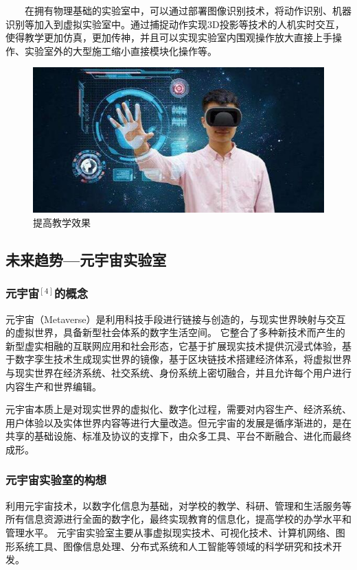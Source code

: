 \documentclass{imutthesis}
\begin{document}
\begin{itemize}
    $\qquad$在拥有物理基础的实验室中，可以通过部署图像识别技术，将动作识别、机器识别等加入到虚拟实验室中。通过捕捉动作实现3D投影等技术的人机实时交互，使得教学更加仿真，更加传神，并且可以实现实验室内围观操作放大直接上手操作、实验室外的大型施工缩小直接模块化操作等。
    \begin{figure}[htbp]
        \centering
        \includegraphics{提高.jpg}
        \caption{提高教学效果}
    \end{figure}

\end{itemize}
\subsection{未来趋势—元宇宙实验室}
\subsubsection{元宇宙$^{[4]}$的概念}
元宇宙（Metaverse）是利用科技手段进行链接与创造的，与现实世界映射与交互的虚拟世界，具备新型社会体系的数字生活空间。
它整合了多种新技术而产生的新型虚实相融的互联网应用和社会形态，它基于扩展现实技术提供沉浸式体验，基于数字孪生技术生成现实世界的镜像，基于区块链技术搭建经济体系，将虚拟世界与现实世界在经济系统、社交系统、身份系统上密切融合，并且允许每个用户进行内容生产和世界编辑。

元宇宙本质上是对现实世界的虚拟化、数字化过程，需要对内容生产、经济系统、用户体验以及实体世界内容等进行大量改造。但元宇宙的发展是循序渐进的，是在共享的基础设施、标准及协议的支撑下，由众多工具、平台不断融合、进化而最终成形。

\subsubsection{元宇宙实验室的构想}
利用元宇宙技术，以数字化信息为基础，对学校的教学、科研、管理和生活服务等所有信息资源进行全面的数字化，最终实现教育的信息化，提高学校的办学水平和管理水平。
元宇宙实验室主要从事虚拟现实技术、可视化技术、计算机网络、图形系统工具、图像信息处理、分布式系统和人工智能等领域的科学研究和技术开发。
\end{document}
